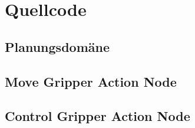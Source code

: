 \newpage
{} %
\listoftables
\newpage

\setlength{\parskip}{0.5em} 




\clearpage
{}  
    \setcounter{page}{1}
\lhead{\nouppercase{\leftmark}}







%
\clearpage
\lhead{}
\printbibliography
{}


\clearpage
\appendix
\section{Quellcode} %
\subsection{Planungsdomäne}

%
\subsection{Move Gripper Action Node}

\subsection{Control Gripper Action Node}



